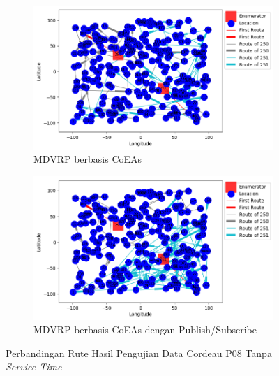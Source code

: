 \begin{figure}[!]
	\centering
	\begin{subfigure}[t]{\textwidth}
		\centering
		\includegraphics[width=\textwidth]{Resources/Images/test_result_cordeau_p08_notw_coes}
		\caption{MDVRP berbasis CoEAs}
		\label{fig:test_result_cordeau_p08_notw_coes}
	\end{subfigure}%
	
	\begin{subfigure}[t]{\textwidth}
		\centering
		\includegraphics[width=\textwidth]{Resources/Images/test_result_cordeau_p08_notw_pubsub_coes}
		\caption{MDVRP berbasis CoEAs dengan Publish/Subscribe}
		\label{fig:test_result_cordeau_p08_notw_pubsub_coes}
	\end{subfigure}
	\caption{Perbandingan Rute Hasil Pengujian Data Cordeau P08 Tanpa \textit{Service Time}}
	\label{fig:test_result_cordeau_p08_notw}
\end{figure}


